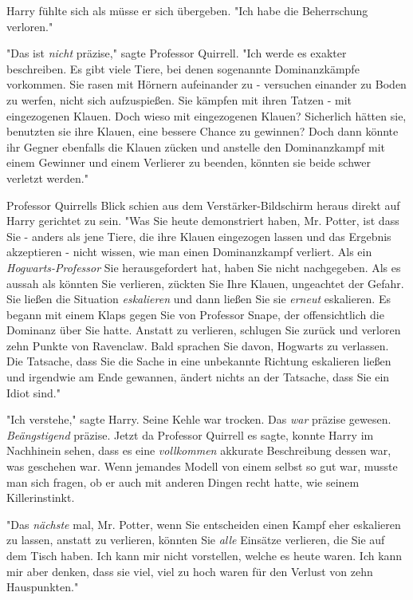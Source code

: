 {Harry fühlte sich als müsse er sich übergeben. "Ich habe die Beherrschung verloren."

"Das ist \emph{nicht} präzise," sagte Professor Quirrell. "Ich werde es exakter beschreiben. Es gibt viele Tiere, bei denen sogenannte Dominanzkämpfe vorkommen. Sie rasen mit Hörnern aufeinander zu - versuchen einander zu Boden zu werfen, nicht sich aufzuspießen. Sie kämpfen mit ihren Tatzen - mit eingezogenen Klauen. Doch wieso mit eingezogenen Klauen? Sicherlich hätten sie, benutzten sie ihre Klauen, eine bessere Chance zu gewinnen? Doch dann könnte ihr Gegner ebenfalls die Klauen zücken und anstelle den Dominanzkampf mit einem Gewinner und einem Verlierer zu beenden, könnten sie beide schwer verletzt werden."

Professor Quirrells Blick schien aus dem Verstärker-Bildschirm heraus direkt auf Harry gerichtet zu sein. "Was Sie heute demonstriert haben, Mr. Potter, ist dass Sie - anders als jene Tiere, die ihre Klauen eingezogen lassen und das Ergebnis akzeptieren - nicht wissen, wie man einen Dominanzkampf verliert. Als ein \emph{Hogwarts-Professor} Sie herausgefordert hat, haben Sie nicht nachgegeben. Als es aussah als könnten Sie verlieren, zückten Sie Ihre Klauen, ungeachtet der Gefahr. Sie ließen die Situation \emph{eskalieren} und dann ließen Sie sie \emph{erneut} eskalieren. Es begann mit einem Klaps gegen Sie von Professor Snape, der offensichtlich die Dominanz über Sie hatte. Anstatt zu verlieren, schlugen Sie zurück und verloren zehn Punkte von Ravenclaw. Bald sprachen Sie davon, Hogwarts zu verlassen. Die Tatsache, dass Sie die Sache in eine unbekannte Richtung eskalieren ließen und irgendwie am Ende gewannen, ändert nichts an der Tatsache, dass Sie ein Idiot sind."

"Ich verstehe," sagte Harry. Seine Kehle war trocken. Das \emph{war} präzise gewesen. \emph{Beängstigend} präzise. Jetzt da Professor Quirrell es sagte, konnte Harry im Nachhinein sehen, dass es eine \emph{vollkommen} akkurate Beschreibung dessen war, was geschehen war. Wenn jemandes Modell von einem selbst so gut war, musste man sich fragen, ob er auch mit anderen Dingen recht hatte, wie seinem Killerinstinkt.

"Das \emph{nächste} mal, Mr. Potter, wenn Sie entscheiden einen Kampf eher eskalieren zu lassen, anstatt zu verlieren, könnten Sie \emph{alle} Einsätze verlieren, die Sie auf dem Tisch haben. Ich kann mir nicht vorstellen, welche es heute waren. Ich kann mir aber denken, dass sie viel, viel zu hoch waren für den Verlust von zehn Hauspunkten."

}
